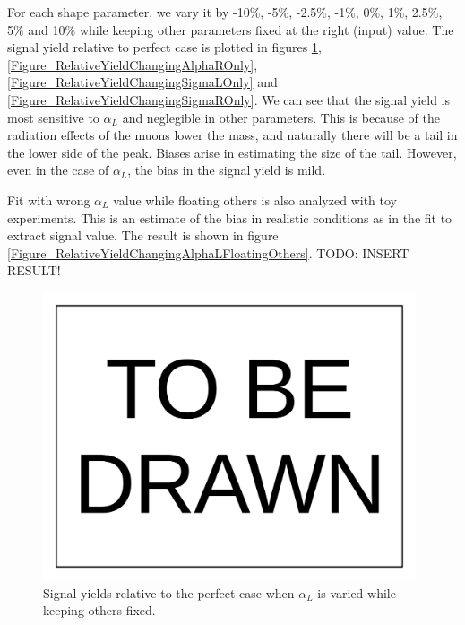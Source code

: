 \documentclass[10pt,a4paper,onecolumn]{	article}
\begin{document}
For each shape parameter, we vary it by -10\%, -5\%, -2.5\%, -1\%, 0\%, 1\%, 2.5\%, 5\% and 10\% while keeping other parameters fixed at the right (input) value.
The signal yield relative to perfect case is plotted in figures \ref{Figure_RelativeYieldChangingAlphaLOnly}, \ref{Figure_RelativeYieldChangingAlphaROnly},
\ref{Figure_RelativeYieldChangingSigmaLOnly} and \ref{Figure_RelativeYieldChangingSigmaROnly}.
We can see that the signal yield is most sensitive to $\alpha_L$ and neglegible in other parameters.
This is because of the radiation effects of the muons lower the mass, and naturally there will be a tail in the lower side of the peak.
Biases arise in estimating the size of the tail.
However, even in the case of $\alpha_L$, the bias in the signal yield is mild.

Fit with wrong $\alpha_L$ value while floating others is also analyzed with toy experiments.
This is an estimate of the bias in realistic conditions as in the fit to extract signal value.
The result is shown in figure \ref{Figure_RelativeYieldChangingAlphaLFloatingOthers}.
TODO: INSERT RESULT!

\begin{figure}
\includegraphics[width=110mm]{ToBeDrawn.pdf}
\caption{Signal yields relative to the perfect case when $\alpha_L$ is varied while keeping others fixed.}
\label{Figure_RelativeYieldChangingAlphaLOnly}
\end{figure}
\end{document}
